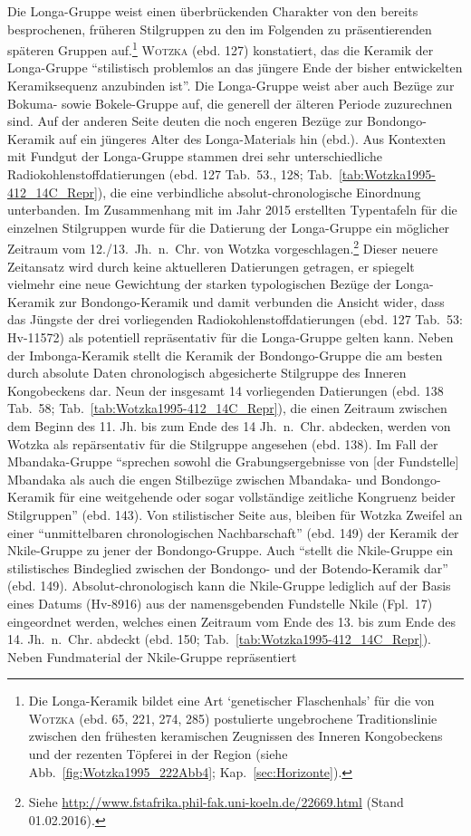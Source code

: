 Die Longa-Gruppe weist einen überbrückenden Charakter von den bereits besprochenen, früheren Stilgruppen zu den im Folgenden zu präsentierenden späteren Gruppen auf.\footnote{Die Longa-Keramik bildet eine Art \enquote*{genetischer Flaschenhals} für die von \textsc{Wotzka} (ebd. 65, 221, 274, 285) postulierte ungebrochene Traditionslinie zwischen den frühesten keramischen Zeugnissen des Inneren Kongobeckens und der rezenten Töpferei in der Region (siehe Abb.~\ref{fig:Wotzka1995_222Abb4}; Kap.~\ref{sec:Horizonte}).\label{ftn:LON-Flaschenhals}} \textsc{Wotzka} (ebd. 127) konstatiert, das die Keramik der Longa-Gruppe \enquote{stilistisch problemlos an das jüngere Ende der bisher entwickelten Keramiksequenz anzubinden ist}. Die Longa-Gruppe weist aber auch Bezüge zur Bokuma- sowie Bokele-Gruppe auf, die generell der älteren Periode zuzurechnen sind. Auf der anderen Seite deuten die noch engeren Bezüge zur Bondongo-Keramik auf ein jüngeres Alter des Longa-Materials hin (ebd.). Aus Kontexten mit Fundgut der Longa-Gruppe stammen drei sehr unterschiedliche Radiokohlenstoffdatierungen (ebd. 127 Tab.~53., 128; Tab.~\ref{tab:Wotzka1995-412_14C_Repr}), die eine verbindliche absolut-chronologische Einordnung unterbanden. Im Zusammenhang mit im Jahr 2015 erstellten Typentafeln für die einzelnen Stilgruppen wurde für die Datierung der Longa-Gruppe ein möglicher Zeitraum vom 12./13.~Jh.~n.~Chr. von Wotzka vorgeschlagen.\footnote{Siehe \url{http://www.fstafrika.phil-fak.uni-koeln.de/22669.html} (Stand 01.02.2016).\label{ftn:fstafrikaWebStilGr-Tafeln}} Dieser neuere Zeitansatz wird durch keine aktuelleren Datierungen getragen, er spiegelt vielmehr eine neue Gewichtung der starken typologischen Bezüge der Longa-Keramik zur Bondongo-Keramik und damit verbunden die Ansicht wider, dass das Jüngste der drei vorliegenden Radiokohlenstoffdatierungen (ebd. 127 Tab.~53: Hv-11572) als potentiell repräsentativ für die Longa-Gruppe gelten kann. Neben der Imbonga-Keramik stellt die Keramik der Bondongo-Gruppe die am besten durch absolute Daten chronologisch abgesicherte Stilgruppe des Inneren Kongobeckens dar. Neun der insgesamt 14 vorliegenden Datierungen (ebd. 138 Tab.~58; Tab.~\ref{tab:Wotzka1995-412_14C_Repr}), die einen Zeitraum zwischen dem Beginn des 11. Jh. bis zum Ende des 14 Jh.~n.~Chr. abdecken, werden von Wotzka als repärsentativ für die Stilgruppe angesehen (ebd. 138). Im Fall der Mbandaka-Gruppe \enquote{sprechen sowohl die Grabungsergebnisse von [der Fundstelle] Mbandaka als auch die engen Stilbezüge zwischen Mbandaka- und Bondongo-Keramik für eine weitgehende oder sogar vollständige zeitliche Kongruenz beider Stilgruppen} (ebd. 143). Von stilistischer Seite aus, bleiben für Wotzka Zweifel an einer \enquote{unmittelbaren chronologischen Nachbarschaft} (ebd. 149) der Keramik der Nkile-Gruppe zu jener der Bondongo-Gruppe. Auch \enquote{stellt die Nkile-Gruppe ein stilistisches Bindeglied zwischen der Bondongo- und der Botendo-Keramik dar} (ebd. 149). Absolut-chronologisch kann die Nkile-Gruppe lediglich auf der Basis eines Datums (Hv-8916) aus der namensgebenden Fundstelle Nkile (Fpl.~17) eingeordnet werden, welches einen Zeitraum vom Ende des 13. bis zum Ende des 14. Jh.~n.~Chr. abdeckt (ebd. 150; Tab.~\ref{tab:Wotzka1995-412_14C_Repr}). Neben Fundmaterial der Nkile-Gruppe repräsentiert 